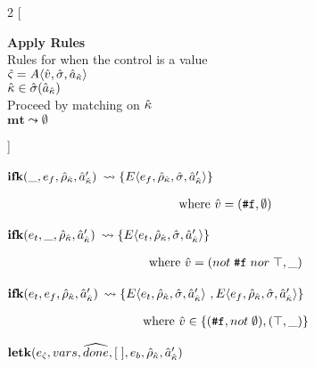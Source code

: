\documentclass[12pt,draft]{article}
\newcommand{\falsesyn}{\texttt{\#f}}
\begin{document}
\begin{multicols*}{2}
[
\begin{center}
\textbf{Apply Rules} \\
Rules for when the control is a value \\
$\hat{\varsigma} = A\langle \hat{v} , \hat{\sigma} , \hat{a}_{\hat{\kappa}} \rangle$ \\
$\hat{\kappa} \in \hat{\sigma}(\hat{a}_{\hat{\kappa}}) $ \\
Proceed by matching on $\hat{\kappa}$ \\
\vspace{5mm}
$\textbf{mt} \leadsto \emptyset$
\end{center}
\vspace{-5mm}
]
\begin{center}
  $\textbf{ifk}(\_ , e_f, \hat{\rho}_{\hat{\kappa}} , \hat{a}_{\hat{\kappa}}')$
  $\leadsto \{E\langle e_f , \hat{\rho}_{\hat{\kappa}} , \hat{\sigma} , \hat{a}_{\hat{\kappa}}' \rangle\}$
\end{center}
\vspace{-7mm}
\begin{align*}
\text{where } \aval &= (\falsesyn, \emptyset)
\end{align*}
\begin{center}
  $\textbf{ifk}(e_t , \_ , \hat{\rho}_{\hat{\kappa}} , \hat{a}_{\hat{\kappa}}')$
  $\leadsto \{E\langle e_t , \hat{\rho}_{\hat{\kappa}} , \hat{\sigma} , \hat{a}_{\hat{\kappa}}' \rangle\}$
\end{center}
\vspace{-7mm}
\begin{align*}
  \text{where } \aval &= (not\;\falsesyn\;nor\;\top , \_)
\end{align*}
\begin{center}
  $\textbf{ifk}(e_t , e_f , \hat{\rho}_{\hat{\kappa}} , \hat{a}_{\hat{\kappa}}')$
  $\leadsto \{E\langle e_t , \hat{\rho}_{\hat{\kappa}} , \hat{\sigma} , \hat{a}_{\hat{\kappa}}' \rangle\ ,
              E\langle e_f , \hat{\rho}_{\hat{\kappa}} , \hat{\sigma} , \hat{a}_{\hat{\kappa}}' \rangle\}$
\end{center}
\vspace{-7mm}
\begin{align*}
\text{where } \aval &\in \{(\falsesyn, not\;\emptyset) , (\top, \_)\}
\end{align*}
\begin{center}
  $\textbf{letk}(e_{\hat{\varsigma}}, vars, \widehat{done}, [\;], e_b,\hat{\rho}_{\hat{\kappa}} , \hat{a}_{\hat{\kappa}}')$

\end{center}
\end{multicols*}
\end{document}
